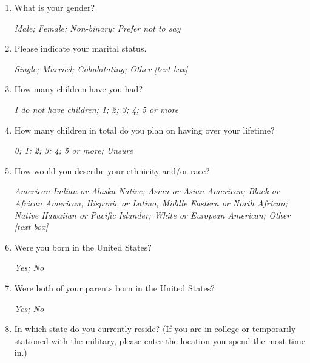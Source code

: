 \documentclass[11pt, headsepline]{article}
\begin{document}
\begin{enumerate}[resume]

    \item What is your gender?

    \textit{Male; Female; Non-binary; Prefer not to say}

    \item Please indicate your marital status.

    \textit{Single; Married; Cohabitating; Other [text box]}

    \item How many children have you had?

    \textit{I do not have children; 1; 2; 3; 4; 5 or more}

    \item How many children in total do you plan on having over your lifetime?

    \textit{0; 1; 2; 3; 4; 5 or more; Unsure}

    \item How would you describe your ethnicity and/or race?

    \textit{American Indian or Alaska Native; Asian or Asian American; Black or African American; Hispanic or Latino; Middle Eastern or North African; Native Hawaiian or Pacific Islander; 
    White or European American; Other [text box]}
    



    \item Were you born in the United States?

    \textit{Yes; No}

    \item Were both of your parents born in the United States?

    \textit{Yes; No}

    \item In which state do you currently reside? (If you are in college or temporarily stationed with the military, please enter the location you spend the most time in.)


\end{enumerate}
\end{document}
